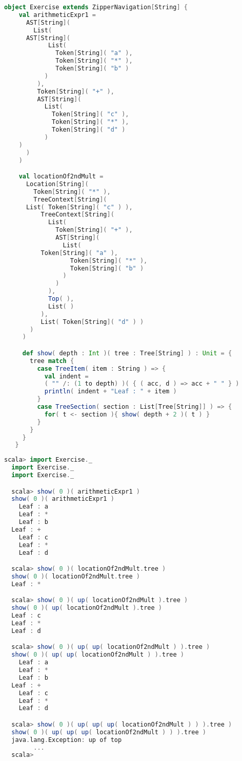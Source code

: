 \begin{lstlisting}[language=Scala,mathescape=true]
  object Exercise extends ZipperNavigation[String] {
    val arithmeticExpr1 =
      AST[String](
        List(
	  AST[String](
            List(
              Token[String]( "a" ),
              Token[String]( "*" ),
              Token[String]( "b" )
           )
         ),
         Token[String]( "+" ),
         AST[String](
           List(
             Token[String]( "c" ),
             Token[String]( "*" ),
             Token[String]( "d" )
           )
	)
      )
    )

    val locationOf2ndMult =
      Location[String](
        Token[String]( "*" ),
        TreeContext[String](
	  List( Token[String]( "c" ) ),
          TreeContext[String](
            List(
              Token[String]( "+" ),
              AST[String](
                List(
		  Token[String]( "a" ),
                  Token[String]( "*" ),
                  Token[String]( "b" )
                )
              )
            ),
            Top( ),
            List( )
          ),
          List( Token[String]( "d" ) )
       )
     )

     def show( depth : Int )( tree : Tree[String] ) : Unit = {
       tree match {
         case TreeItem( item : String ) => {
           val indent =
           ( "" /: (1 to depth) )( { ( acc, d ) => acc + " " } )
           println( indent + "Leaf : " + item )
         }
         case TreeSection( section : List[Tree[String]] ) => {
           for( t <- section ){ show( depth + 2 )( t ) }
         }
       }
     }     
   }
\end{lstlisting}

\break

\begin{lstlisting}[language=Scala,mathescape=true]
  scala> import Exercise._
  import Exercise._
  import Exercise._

  scala> show( 0 )( arithmeticExpr1 )
  show( 0 )( arithmeticExpr1 )
    Leaf : a
    Leaf : *
    Leaf : b
  Leaf : +
    Leaf : c
    Leaf : *
    Leaf : d

  scala> show( 0 )( locationOf2ndMult.tree )
  show( 0 )( locationOf2ndMult.tree )
  Leaf : *

  scala> show( 0 )( up( locationOf2ndMult ).tree )
  show( 0 )( up( locationOf2ndMult ).tree )
  Leaf : c
  Leaf : *
  Leaf : d

  scala> show( 0 )( up( up( locationOf2ndMult ) ).tree )
  show( 0 )( up( up( locationOf2ndMult ) ).tree )
    Leaf : a
    Leaf : *
    Leaf : b
  Leaf : +
    Leaf : c
    Leaf : *
    Leaf : d

  scala> show( 0 )( up( up( up( locationOf2ndMult ) ) ).tree )
  show( 0 )( up( up( up( locationOf2ndMult ) ) ).tree )
  java.lang.Exception: up of top
        ...
  scala> 
\end{lstlisting}


